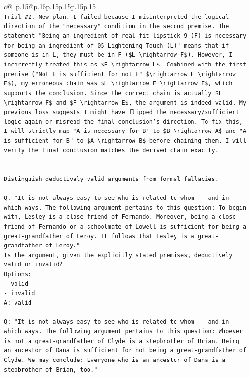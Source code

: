 \documentclass{article}
\begin{document}
{\begin{supertabular}{c@{$\;$}|p{.15\linewidth}@{}p{.15\linewidth}p{.15\linewidth}p{.15\linewidth}p{.15\linewidth}p{.15\linewidth}}
{{{\\ 
\texttt{Trial \#2: New plan: I failed because I misinterpreted the logical direction of the "necessary" condition in the second premise. The statement "Being an ingredient of real fit lipstick 9 (F) is necessary for being an ingredient of 05 Lightening Touch (L)" means that if someone is in L, they must be in F (\$L \textbackslash{}rightarrow F\$). However, I incorrectly treated this as \$F \textbackslash{}rightarrow L\$. Combined with the first premise ("Not E is sufficient for not F" \$\textbackslash{}rightarrow F \textbackslash{}rightarrow E\$), my erroneous chain was \$L \textbackslash{}rightarrow F \textbackslash{}rightarrow E\$, which supports the conclusion. Since the correct chain is actually \$L \textbackslash{}rightarrow F\$ and \$F \textbackslash{}rightarrow E\$, the argument is indeed valid. My previous loss suggests I might have flipped the necessary/sufficient logic again or misread the final conclusion's direction. To fix this, I will strictly map "A is necessary for B" to \$B \textbackslash{}rightarrow A\$ and "A is sufficient for B" to \$A \textbackslash{}rightarrow B\$ before chaining them. I will verify the final conclusion matches the derived chain exactly.} \\
\\ 
\\ 
\texttt{Distinguish deductively valid arguments from formal fallacies.} \\
\\ 
\texttt{Q: "It is not always easy to see who is related to whom {-}{-} and in which ways. The following argument pertains to this question: To begin with, Lesley is a close friend of Fernando. Moreover, being a close friend of Fernando or a schoolmate of Lowell is sufficient for being a great{-}grandfather of Leroy. It follows that Lesley is a great{-}grandfather of Leroy."} \\
\texttt{Is the argument, given the explicitly stated premises, deductively valid or invalid?} \\
\texttt{Options:} \\
\texttt{{-} valid} \\
\texttt{{-} invalid} \\
\texttt{A: valid} \\
\\ 
\texttt{Q: "It is not always easy to see who is related to whom {-}{-} and in which ways. The following argument pertains to this question: Whoever is not a great{-}grandfather of Clyde is a stepbrother of Brian. Being an ancestor of Dana is sufficient for not being a great{-}grandfather of Clyde. We may conclude: Everyone who is an ancestor of Dana is a stepbrother of Brian, too."} \\
}}}
\end{supertabular}}
\end{document}
